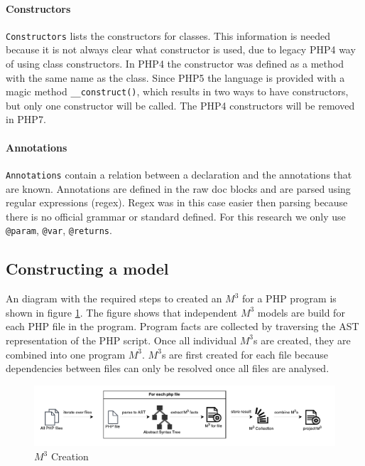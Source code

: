 \documentclass[../main.tex]{subfiles}
\begin{document}
    \paragraph{Constructors} \texttt{Constructors} lists the constructors for classes. 
    This information is needed because it is not always clear what constructor is used, due to legacy PHP4 way of using class constructors.
    In PHP4 the constructor was defined as a method with the same name as the class.
    Since PHP5 the language is provided with a magic method \texttt{\_\_construct()}, which results in two ways to have constructors, but only one constructor will be called.
    The PHP4 constructors will be removed in PHP7.
    
    \paragraph{Annotations} \texttt{Annotations} contain a relation between a declaration and the annotations that are known.
    Annotations are defined in the raw doc blocks and are parsed using regular expressions (regex).
    Regex was in this case easier then parsing because there is no official grammar or standard defined.
    For this research we only use \texttt{@param}, \texttt{@var}, \texttt{@returns}.

    \subsection{Constructing a model}
    An diagram with the required steps to created an $M^3$ for a PHP program is shown in figure \ref{fig:research_m3_creation}.
    The figure shows that independent $M^3$ models are build for each PHP file in the program.
    Program facts are collected by traversing the AST representation of the PHP script.
    Once all individual $M^3$s are created, they are combined into one program $M^3$.
    $M^3$s are first created for each file because dependencies between files can only be resolved once all files are analysed.
    
    \begin{figure}[H]
        \centerline{\includegraphics{Diagrams/M3Creation.pdf}}
        \caption{$M^3$ Creation}
        \label{fig:research_m3_creation}
    \end{figure}
\end{document}
